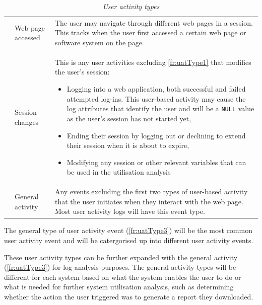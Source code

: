 \begin{table}[!htb]
	\centering
	\caption[User activity types]
	{\textit{User activity types}}
	\label{tbl:ch2_userActivityTypes}
	\begin{tabularx}{\textwidth}{llX}
		\toprule
		\thead{Req. ID} & \thead{Activity Type} & \thead{Description} \\
		\midrule

		\rowcolor{lightgray}
		\subsubphase{fr:uatType1} & Web page accessed & The user may navigate through different web pages in a session. This tracks when the user first accessed a certain web page or software system on the page. \\


		\subsubphase{fr:uatType2} & Session changes & This is any user activities excluding \ref{fr:uatType1} that modifies the user's session:
		\begin{itemize}
			\item Logging into a web application, both successful and failed attempted log-ins. This user-based activity may cause the log attributes that identify the user and will be a \texttt{NULL} value as the user's session has not started yet,
			\item Ending their session by logging out or declining to extend their session when it is about to expire,
			\item Modifying any session or other relevant variables that can be used in the utilisation analysis
		\end{itemize}\\

		\rowcolor{lightgray}
		\subsubphase{fr:uatType3} & General activity & Any events excluding the first two types of user-based activity that the user initiates when they interact with the web page. Most user activity logs will
		have this event type.\\ 
		\bottomrule
	\end{tabularx}
\end{table}

\clearpage

The general type of user activity event (\ref{fr:uatType3}) will be the most common user activity event and will be catergorised up into different user activity events. \par These user activity types can be further expanded with the general activity (\ref{fr:uatType3}) for log analysis purposes. The general activity types will be different for each system based on what the system enables the user to do or what is needed for further system utilisation analysis, such as determining whether the action the user triggered was to generate a report they downloaded.

